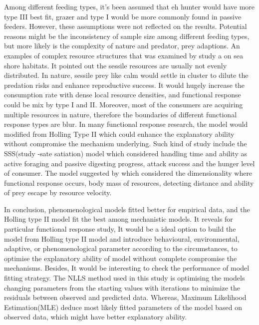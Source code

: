 \documentclass[11pt, a4paper]{article}
\begin{document}
Among different feeding types, it’s been assumed that eh hunter would have more type III best fit, grazer and type I would be more commonly found in passive feeders. However, these assumptions were not reflected on the results. Potential reasons might be the inconsistency of sample size among different feeding types, but more likely is the complexity of nature and predator, prey adaptions.  An examples of complex resource structures that was examined by study a on sea shore habitats\cite{Griffen2012}. It pointed out the sessile resources are usually not evenly distributed. In nature, sessile prey like calm would settle in cluster to dilute the predation risks and enhance reproductive success. It would hugely increase the consumption rate with dense local resource densities, and functional response could be mix  by type I and II. Moreover, most of the consumers are acquiring multiple resources in nature, therefore the boundaries of different functional response types  are blur. 
In many functional response research, the model would modified from Holling Type II which could enhance the explanatory ability without compromise the mechanism underlying\cite{Jeschke2002}\cite{Schmitz1997}. Such kind of study include the SSS(study -sate satiation) model which considered handling time and ability as active foraging and passive digesting progress, attack success and  the hunger level of consumer. The model suggested by\cite{Pawar2012} which considered the dimensionality where functional response occurs, body mass of resources, detecting distance and ability of prey escape by resource velocity. 

In conclusion, phenomenological models fitted better for empirical data, and the Holling type II model fit the best among mechanistic models. It reveals for particular functional response study, It would be a ideal option to build the model from Holling type II model and introduce behavioural, environmental, adaptive, or phenomenological parameter according to the circumstances, to optimise the explanatory ability of model without complete compromise the mechanisms. Besides, It would be interesting to check the performance of model fitting strategy. The NLLS method used in this study is optimising the models changing parameters from the starting values with iterations to minimize the residuals between observed and predicted data. Whereas, Maximum Likelihood Estimation(MLE) deduce most likely fitted parameters of the model based on observed data, which might have better explanatory ability.  




\end{document}
